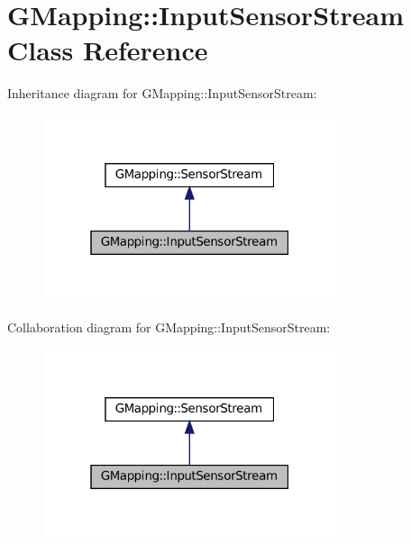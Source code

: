 \hypertarget{classGMapping_1_1InputSensorStream}{}\section{G\+Mapping\+:\+:Input\+Sensor\+Stream Class Reference}
\label{classGMapping_1_1InputSensorStream}


Inheritance diagram for G\+Mapping\+:\+:Input\+Sensor\+Stream\+:
\nopagebreak
\begin{figure}[H]
\begin{center}
\leavevmode
\includegraphics[width=244pt]{classGMapping_1_1InputSensorStream__inherit__graph}
\end{center}
\end{figure}


Collaboration diagram for G\+Mapping\+:\+:Input\+Sensor\+Stream\+:
\nopagebreak
\begin{figure}[H]
\begin{center}
\leavevmode
\includegraphics[width=244pt]{classGMapping_1_1InputSensorStream__coll__graph}
\end{center}
\end{figure}
